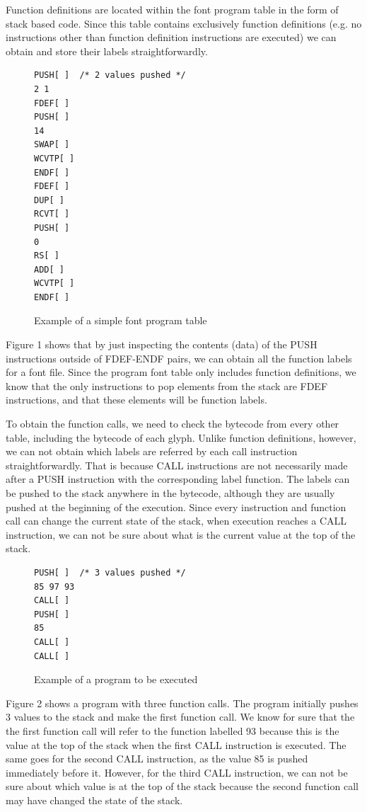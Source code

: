 \documentclass[12pt]{article}
\begin{document}
Function definitions are located within the font program table in the
form of stack based code. Since this table contains exclusively function
definitions (e.g. no instructions other than function definition
instructions are executed) we can obtain and store their labels
straightforwardly. 

\begin{figure}[ht!]
\begin{verbatim}
PUSH[ ]  /* 2 values pushed */
2 1
FDEF[ ]
PUSH[ ]
14
SWAP[ ]
WCVTP[ ]
ENDF[ ]
FDEF[ ]
DUP[ ]
RCVT[ ]
PUSH[ ]
0
RS[ ]
ADD[ ]
WCVTP[ ]
ENDF[ ]
\end{verbatim}
\caption{Example of a simple font program table}
\end{figure}

Figure 1 shows that by just inspecting the contents (data) of
the PUSH instructions outside of FDEF-ENDF pairs, we can obtain all the
function labels for a font file. Since the program font table only
includes function definitions, we know that the only instructions to pop
elements from the stack are FDEF instructions, and that these elements
will be function labels.

To obtain the function calls, we need to check the bytecode from every
other table, including the bytecode of each glyph. Unlike function
definitions, however, we can not obtain which labels are referred by each
call instruction straightforwardly. That is because CALL instructions
are not necessarily made after a PUSH instruction with the corresponding
label function. The labels can be pushed to the stack anywhere in the
bytecode, although they are usually pushed at the beginning of the
execution. Since every instruction and function call can change the
current state of the stack, when execution reaches a CALL instruction, we
can not be sure about what is the current value at the top of the stack. 

\begin{figure}[ht!]
\begin{verbatim}
PUSH[ ]  /* 3 values pushed */
85 97 93
CALL[ ]
PUSH[ ]
85
CALL[ ]
CALL[ ]
\end{verbatim}
\caption{Example of a program to be executed}
\end{figure}

Figure 2 shows a program with three function calls. The program
initially pushes 3 values to the stack and make the first function call.
We know for sure that the the first function call will refer to the
function labelled 93 because this is the value at the top of the stack
when the first CALL instruction is executed. The same goes for the
second CALL instruction, as the value 85 is pushed immediately before
it. However, for the third CALL instruction, we can not be sure about which
value is at the top of the stack because the second function call may have
changed the state of the stack.  
\end{document}
